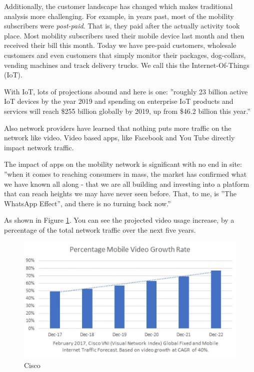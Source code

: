 \documentclass[sigconf]{acmart}
\begin{document}
Additionally, the customer landscape has changed which makes traditional analysis more challenging.  For example, in years past, most of the mobility subscribers were {\em post-paid}.   That is, they paid after the actually activity took place.  Most mobility subscribers used their mobile device last month and then received their bill this month.  Today we have pre-paid customers, wholesale customers and even customers that simply monitor their packages, dog-collars, vending machines and track delivery trucks.  We call this the Internet-Of-Things (IoT).  

With IoT, lots of projections abound and here is one: ''roughly 23 billion active IoT devices by the year 2019 and spending on enterprise IoT products and services will reach \$255 billion globally by 2019, up from \$46.2 billion this year.'' \cite{www-systemid-com}  

Also network providers have learned that nothing puts more traffic on the network like video.  Video based apps, like Facebook and You Tube directly impact network traffic. \cite{www-cisco-com} 


The impact of apps on the mobility network is significant with no end in site:  ''when it comes to reaching consumers in mass, the market has confirmed what we have known all along - that we are all building and investing into a platform that can reach heights we may have never seen before.  That, to me, is ''The WhatsApp Effect'', and there is no turning back now.'' \cite{www-techcrunch-com}

As shown in Figure \ref{f:Cisco}. You can see the projected video usage increase, by a percentage of the total network traffic over the next five years.

\begin{figure}[h]
\includegraphics[width=\columnwidth]{images/graph.png}
\caption{Cisco}\label{f:Cisco}
\end{figure}
\end{document}
